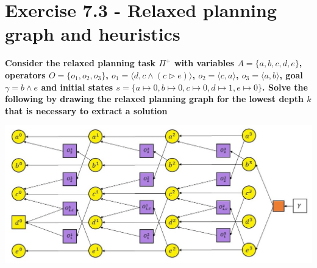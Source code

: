 \documentclass[12pt,a4paper]{article}
\begin{document}
\newpage
\section*{Exercise 7.3 - Relaxed planning graph and heuristics}

\textbf{Consider the relaxed planning task $\Pi^+$ with variables 
$A=\{a,b,c,d,e\}$, operators $O=\{o_1,o_2,o_3\}$, $o_1=\langle d, c \land (c \triangleright e)\rangle$,
$o_2= \langle c , a \rangle$, $o_3= \langle a, b\rangle$, goal
$\gamma = b \land e$ and initial states $s=\{ a\mapsto 0, 
b\mapsto 0, c \mapsto 0, d \mapsto 1, e \mapsto 0 \}$. Solve the following
by drawing the relaxed planning graph for the lowest depth $k$
that is necessary to extract a solution}
\begin{center}
	\includegraphics[scale=0.5]{img1.jpg}\\
\end{center}
\end{document}
